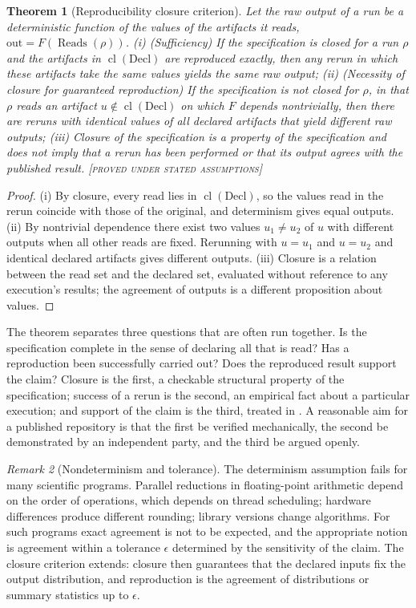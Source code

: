 \documentclass[11pt,twoside,openright]{book}
\theoremstyle{plain}
\newtheorem{theorem}{Theorem}[chapter]
\theoremstyle{definition}
\theoremstyle{remark}
\newtheorem{remark}[theorem]{Remark}
\newcommand{\Proved}{\textup{\textsc{[proved under stated assumptions]}}}
\DeclareMathOperator{\Cl}{cl}
\DeclareMathOperator{\Rd}{Reads}
\begin{document}
\begin{theorem}[Reproducibility closure criterion]\label{thm:closure}
Let the raw output of a run be a deterministic function of the values of the artifacts it reads, $\mathrm{out}=F(\Rd(\rho))$.
(i) (Sufficiency) If the specification is closed for a run $\rho$ and the artifacts in $\Cl(\mathrm{Decl})$ are reproduced exactly, then any rerun in which these artifacts take the same values yields the same raw output; (ii) (Necessity of closure for guaranteed reproduction) If the specification is not closed for $\rho$, in that $\rho$ reads an artifact $u\notin\Cl(\mathrm{Decl})$ on which $F$ depends nontrivially, then there are reruns with identical values of all declared artifacts that yield different raw outputs; (iii) Closure of the specification is a property of the specification and does not imply that a rerun has been performed or that its output agrees with the published result.
\Proved{}
\end{theorem}

\begin{proof}
(i) By closure, every read lies in $\Cl(\mathrm{Decl})$, so the values read in the rerun coincide with those of the original, and determinism gives equal outputs. (ii) By nontrivial dependence there exist two values $u_1\ne u_2$ of $u$ with different outputs when all other reads are fixed. Rerunning with $u=u_1$ and $u=u_2$ and identical declared artifacts gives different outputs. (iii) Closure is a relation between the read set and the declared set, evaluated without reference to any execution's results; the agreement of outputs is a different proposition about values.
\end{proof}

The theorem separates three questions that are often run together. Is the specification complete in the sense of declaring all that is read? Has a reproduction been successfully carried out? Does the reproduced result support the claim? Closure is the first, a checkable structural property of the specification; success of a rerun is the second, an empirical fact about a particular execution; and support of the claim is the third, treated in . A reasonable aim for a published repository is that the first be verified mechanically, the second be demonstrated by an independent party, and the third be argued openly.

\begin{remark}[Nondeterminism and tolerance]
The determinism assumption fails for many scientific programs. Parallel reductions in floating-point arithmetic depend on the order of operations, which depends on thread scheduling; hardware differences produce different rounding; library versions change algorithms. For such programs exact agreement is not to be expected, and the appropriate notion is agreement within a tolerance $\epsilon$ determined by the sensitivity of the claim. The closure criterion extends: closure then guarantees that the declared inputs fix the output distribution, and reproduction is the agreement of distributions or summary statistics up to $\epsilon$.
\end{remark}
\end{document}
